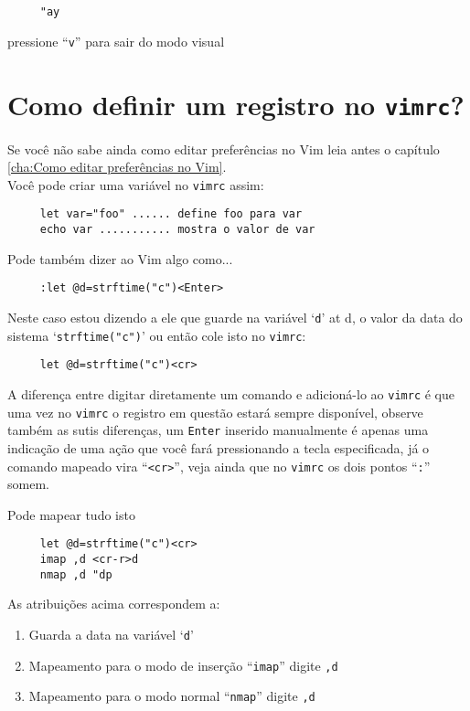 \begin{verbatim}
     "ay
\end{verbatim}

pressione ``\verb|v|'' para sair do modo visual

\section{Como definir um registro no {\tt vimrc}?}
\label{Como definir um registro no vimrc?}

Se você não sabe ainda como editar preferências no Vim
leia antes o capítulo \ref{cha:Como editar preferências no Vim}. \\


Você pode criar uma variável no {\tt vimrc} assim:

\begin{verbatim}
     let var="foo" ...... define foo para var
     echo var ........... mostra o valor de var
\end{verbatim}

Pode também dizer ao Vim algo como...

\begin{verbatim}
     :let @d=strftime("c")<Enter>
\end{verbatim}

Neste caso estou dizendo a ele que guarde na variável `{\tt d}' at d,
o valor da data do sistema `{\tt strftime("c")}' ou então cole isto no
{\tt vimrc}:

\begin{verbatim}
     let @d=strftime("c")<cr>
\end{verbatim}

A diferença entre digitar diretamente um comando e adicioná-lo ao
{\tt vimrc} é que uma vez no {\tt vimrc} o registro em questão estará sempre
disponível, observe também as sutis diferenças, um {\tt Enter} inserido
manualmente é apenas uma indicação de uma ação que você fará
pressionando a tecla especificada, já o comando mapeado vira
``\verb|<cr>|'', veja ainda que no {\tt vimrc} os dois pontos ``\verb|:|''
somem.

Pode mapear tudo isto

\begin{verbatim}
     let @d=strftime("c")<cr>
     imap ,d <cr-r>d
     nmap ,d "dp
\end{verbatim}

As atribuições acima correspondem a:

\begin{enumerate}
 \item  Guarda a data na variável `{\tt d}'
 \item  Mapeamento para o modo de inserção ``{\tt imap}'' digite {\tt ,d}
 \item  Mapeamento para o modo normal ``{\tt nmap}'' digite {\tt ,d}
\end{enumerate}

